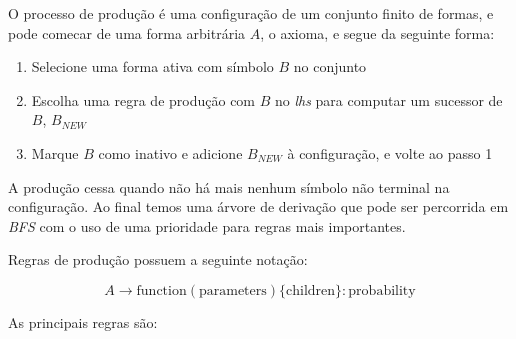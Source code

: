 \documentclass[a4paper, 11pt]{article}
\begin{document}
    O processo de produção é uma configuração de um conjunto finito de formas, e pode comecar de uma forma arbitrária $A$, o axioma, e segue da seguinte forma:

    \begin{enumerate}
        \item Selecione uma forma ativa com símbolo $B$ no conjunto
        \item Escolha uma regra de produção com $B$ no \textit{lhs} para computar um sucessor de $B$, $B_{NEW}$
        \item Marque $B$ como inativo e adicione $B_{NEW}$ à configuração, e volte ao passo 1
    \end{enumerate}

    A produção cessa quando não há mais nenhum símbolo não terminal na configuração. Ao final temos uma árvore de derivação que pode ser percorrida em \textit{BFS} com o uso de uma prioridade para regras mais importantes. 

    Regras de produção possuem a seguinte notação:

    $$A \rightarrow \text{function}(\text{parameters})\{\text{children}\}:\text{probability}$$

    As principais regras são: 
\end{document}
